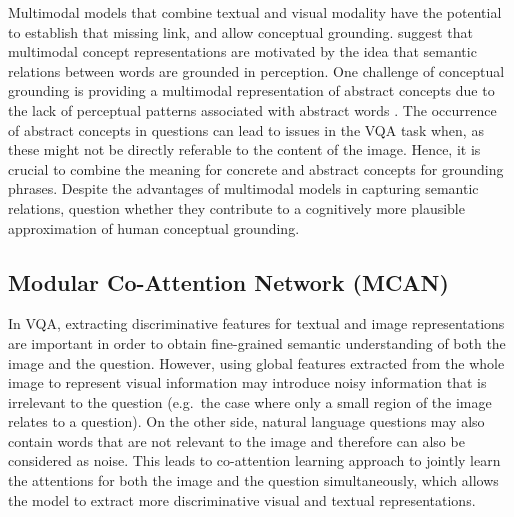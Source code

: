 \documentclass{article}
\begin{document}
Multimodal models that combine textual and visual modality have the potential to establish that missing link, and allow conceptual grounding. \cite{beinborn2018multimodal} suggest that multimodal concept representations are motivated by the idea that semantic relations between words are grounded in perception. One challenge of conceptual grounding is providing a multimodal representation of abstract concepts due to the lack of perceptual patterns associated with abstract words \cite{hill2014multi}. The occurrence of abstract concepts in questions can lead to issues in the VQA task when, as these might not be directly referable to the content of the image. Hence, it is crucial to combine the meaning for concrete and abstract concepts for grounding phrases. Despite the advantages of multimodal models in capturing semantic relations, \cite{beinborn2018multimodal} question whether they contribute to a cognitively more plausible approximation of human conceptual grounding.

\subsection{Modular Co-Attention Network (MCAN)} \label{subsection:mcan}
In VQA, extracting discriminative features for textual and image representations are important in order to obtain fine-grained semantic understanding of both the image and the question. However, using global features extracted from the whole image to represent visual information may introduce noisy information that is irrelevant to the question (e.g.\ the case where only a small region of the image relates to a question). On the other side, natural language questions may also contain words that are not relevant to the image and therefore can also be considered as noise. 
This leads to co-attention learning approach to jointly learn the attentions for both the image and the question simultaneously, which allows the model to extract more discriminative visual and textual representations. 
\end{document}
